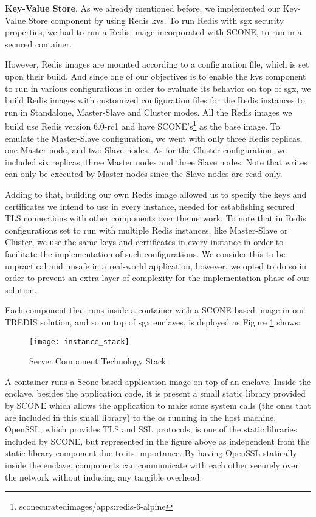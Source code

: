 \vspace{3mm}
\textbf{Key-Value Store}. As we already mentioned before, we implemented our Key-Value Store component by using Redis \gls{kvs}. To run Redis with \gls{sgx} security properties, we had to run a Redis image incorporated with SCONE, to run in a secured container. 

However, Redis images are mounted according to a configuration file, which is set upon their build. 
And since one of our objectives is to enable the \gls{kvs} component to run in various configurations in order to evaluate its behavior on top of \gls{sgx}, we build Redis images with customized configuration files for the Redis instances to run in Standalone, Master-Slave and Cluster modes. All the Redis images we build use Redis version 6.0-rc1 and have SCONE's\footnote{sconecuratedimages/apps:redis-6-alpine} as the base image. To emulate the Master-Slave configuration, we went with only three Redis replicas, one Master node, and two Slave nodes. As for the Cluster configuration, we included six replicas, three Master nodes and three Slave nodes. Note that writes can only be executed by Master nodes since the Slave nodes are read-only.

Adding to that, building our own Redis image allowed us to specify the keys and certificates we intend to use in every instance, needed for establishing secured TLS connections with other components over the network. To note that in Redis configurations set to run with multiple Redis instances, like Master-Slave or Cluster, we use the same keys and certificates in every instance in order to facilitate the implementation of such configurations. We consider this to be unpractical and unsafe in a real-world application, however, we opted to do so in order to prevent an extra layer of complexity for the implementation phase of our solution.


\vspace{3mm}
Each component that runs inside a container with a SCONE-based image in our TREDIS solution, and so on top of \gls{sgx} enclaves, is deployed as Figure \ref{fig:instanceStack} shows:
\begin{figure}[htbp]
	\centering
	{\texttt{[image: instance\_stack]}}
	\caption{Server Component Technology Stack}
	\label{fig:instanceStack}
\end{figure}

A container runs a Scone-based application image on top of an enclave. Inside the enclave, besides the application code, it is present a small static library provided by SCONE which allows the application to make some system calls (the ones that are included in this small library) to the \gls{os} running in the host machine. OpenSSL, which provides TLS and SSL protocols, is one of the static libraries included by SCONE, but represented in the figure above as independent from the static library component due to its importance. By having OpenSSL statically inside the enclave, components can communicate with each other securely over the network without inducing any tangible overhead. 



